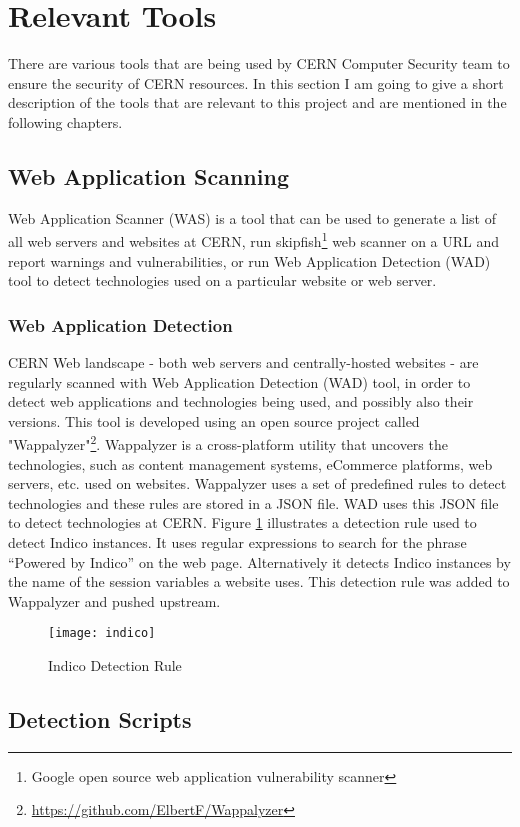 \section{Relevant Tools}
\label{sec:tools}
There are various tools that are being used by CERN Computer Security team to ensure the security of CERN resources. In this section I am going to give a short description of the tools that are relevant to this project and are mentioned in the following chapters. 
\subsection{Web Application Scanning} 
Web Application Scanner (WAS) is a tool that can be used to generate a list of all web servers and websites at CERN, run skipfish\footnote{Google open source web application vulnerability scanner} web scanner on a URL and report warnings and vulnerabilities, or run Web Application Detection (WAD) tool to detect technologies used on a particular website or web server.
\subsubsection{Web Application Detection}
CERN Web landscape - both web servers and centrally-hosted websites - are regularly scanned with Web Application Detection (WAD) tool, in order to detect web applications and technologies being used, and possibly also their versions. This tool is developed using an open source project called "Wappalyzer"\footnote{\url{https://github.com/ElbertF/Wappalyzer}}. Wappalyzer is a cross-platform utility that uncovers the technologies, such as content management systems, eCommerce platforms, web servers, etc. used on websites.  Wappalyzer uses a set of predefined rules to detect technologies and these rules are stored in a JSON file. WAD uses this JSON file to detect technologies at CERN. Figure \ref{figure:indico} illustrates a detection rule used to detect Indico instances. It uses regular expressions to search for the phrase ``Powered by Indico'' on the web page. Alternatively it detects Indico instances by the name of the session variables a website uses. This detection rule was added to Wappalyzer and pushed upstream.
\begin{figure}[h!]
\label{figure:indico}
  \centering
    \texttt{[image: indico]}
  \caption{Indico Detection Rule}
  
\end{figure}
 
\subsection{Detection Scripts}

